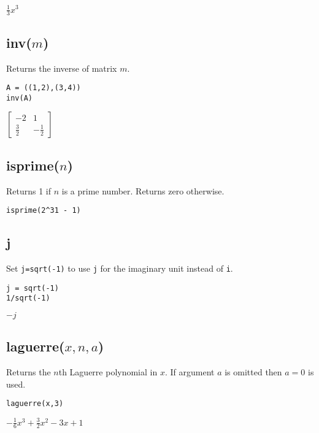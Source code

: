 \noindent
$\displaystyle \tfrac{1}{3}x^3$

\subsection*{inv($m$)}

Returns the inverse of matrix $m$.

{\color{blue}
\begin{verbatim}
A = ((1,2),(3,4))
inv(A)
\end{verbatim}
}

\noindent
$\displaystyle
\begin{bmatrix}
-2 & 1\\
\tfrac{3}{2} & -\tfrac{1}{2}
\end{bmatrix}
$

\subsection*{isprime($n$)}

Returns 1 if $n$ is a prime number. Returns zero otherwise.

{\color{blue}
\begin{verbatim}
isprime(2^31 - 1)
\end{verbatim}
}


\subsection*{j}

Set {\tt j=sqrt(-1)} to use {\tt j} for the imaginary unit instead of {\tt i}.

{\color{blue}
\begin{verbatim}
j = sqrt(-1)
1/sqrt(-1)
\end{verbatim}
}

\noindent
$-j$

\subsection*{laguerre($x,n,a$)}

Returns the $n$th Laguerre polynomial in $x$.
If argument $a$ is omitted then $a=0$ is used.

{\color{blue}
\begin{verbatim}
laguerre(x,3)
\end{verbatim}
}

\noindent
$\displaystyle -\tfrac{1}{6}x^3+\tfrac{3}{2}x^2-3x+1$

